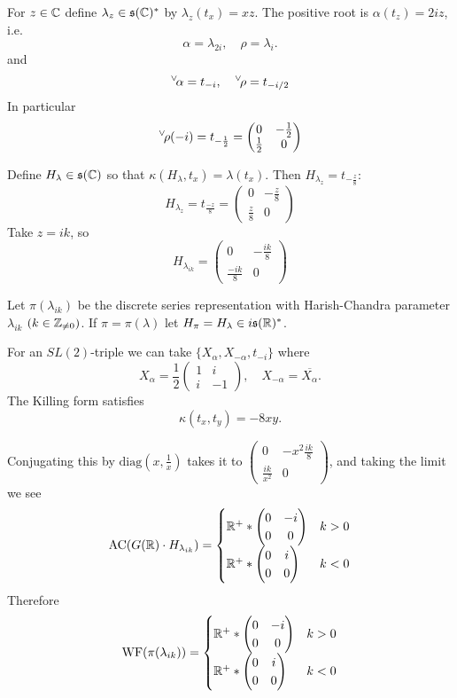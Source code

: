 \documentclass{article}
\theoremstyle{definition}
\numberwithin{equation}{section}
\renewcommand{\-}{\hyp{}}
\newcommand{\s}{\mathfrak s}
\newcommand{\WF}{\mathrm{WF}}
\newcommand{\AC}{\mathrm{AC}}
\newcommand{\ch}[1]{\negthinspace\negthinspace\negthinspace\phantom{a}^\vee\negthinspace #1}
\begin{document}
For $z\in \mathbb{C}$ define $\lambda_z\in \s(\C)^*$ by $\lambda_z(t_x)=xz$.
The positive root is  $\alpha(t_z)=2iz$, i.e.
$$
\alpha=\lambda_{2i},\quad \rho=\lambda_i.
$$
and
$$
\ch\alpha=t_{-i}, \quad \ch\rho=t_{-i/2}
$$
In particular
$$
\ch\rho(-i)=t_{-\frac 12}=\begin{pmatrix}0&-\frac 12\\\frac 12&0
\end{pmatrix}
$$

Define $H_{\lambda}\in \s(\C)$ so that $\kappa(H_\lambda,t_x)=\lambda(t_x)$. Then $H_{\lambda_z}=t_{-\frac z8}$:
$$
H_{\lambda_z}=t_{\frac{-z}8}=
\begin{pmatrix}0&-\frac{z}8\\\frac{z}8&0
\end{pmatrix}
$$
Take $z=ik$, so
$$
H_{\lambda_{ik}}=
\begin{pmatrix}0&-\frac{ik}8\\\frac{-ik}8&0
\end{pmatrix}
$$

Let $\pi(\lambda_{ik})$ be the discrete series representation with Harish-Chandra parameter $\lambda_{ik}$ $(k\in \mathbb{Z}_{\ne 0})$.
If $\pi=\pi(\lambda)$ let $H_\pi=H_\lambda\in i\s(\R)^*$.

For an $SL(2)$-triple we can take $\{X_\alpha,X_{-\alpha},t_{-i}\}$ where
$$
X_\alpha=\frac12\begin{pmatrix}1&i\\i&-1
\end{pmatrix}, \quad X_{-\alpha}=\overline{X_\alpha}.
$$
The Killing form satisfies
$$
\kappa(t_x,t_y)=-8xy.
$$



Conjugating this by $\mathrm{diag}(x,\frac 1x)$ takes it to
$\begin{pmatrix}0&-x^2\frac{ik}8\\\frac{ik}{x^2}&0
\end{pmatrix}$,
and taking the limit we see
$$
\AC(G(\R)\cdot H_{\lambda_{ik}})=
\begin{cases}
  \R^+*\begin{pmatrix}0&-i\\0&0
  \end{pmatrix}&k>0\\
    \R^+*\begin{pmatrix}0&i\\0&0
  \end{pmatrix}&k<0\\
  \end{cases}
$$
Therefore
$$
\WF(\pi(\lambda_{ik}))
=
\begin{cases}
  \R^+*\begin{pmatrix}0&-i\\0&0
  \end{pmatrix}&k>0\\
    \R^+*\begin{pmatrix}0&i\\0&0
  \end{pmatrix}&k<0\\
  \end{cases}
$$
\end{document}
